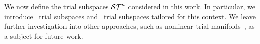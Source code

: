 We now define the trial subspaces $\mathcal{ ST }^{n}$ considered in this work. In
	particular, we introduce \spatialAcronym\ trial subspaces and
	\spaceTimeAcronym\ trial subspaces tailored for this context. 
We leave further investigation into other approaches, such as nonlinear
	trial manifolds~\cite{leeCarlberg}, as a subject for future work.

